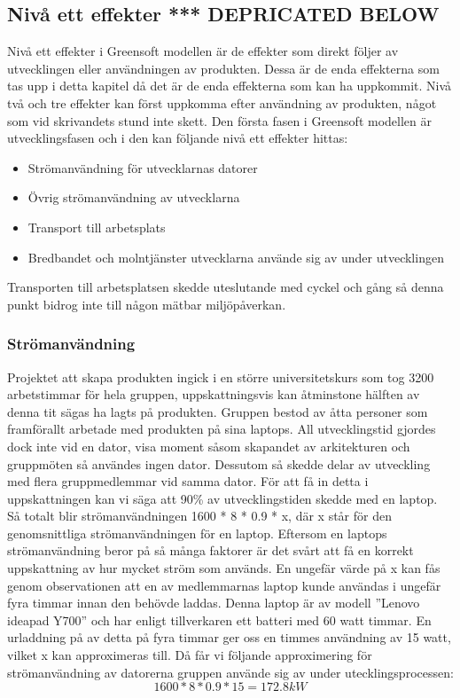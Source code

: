 \subsection{Nivå ett effekter *** DEPRICATED BELOW}
Nivå ett effekter i Greensoft modellen är de effekter som direkt följer av utvecklingen eller användningen av produkten. Dessa är de enda effekterna som tas upp i detta kapitel då det är de enda effekterna som kan ha uppkommit. Nivå två och tre effekter kan först uppkomma efter användning av produkten, något som vid skrivandets stund inte skett. Den första fasen i Greensoft modellen är utvecklingsfasen och i den kan följande nivå ett effekter hittas:
\begin{itemize}
	\item Strömanvändning för utvecklarnas datorer
	\item Övrig strömanvändning av utvecklarna
	\item Transport till arbetsplats
	\item Bredbandet och molntjänster utvecklarna använde sig av under utvecklingen
\end{itemize}

Transporten till arbetsplatsen skedde uteslutande med cyckel och gång så denna punkt bidrog inte till någon mätbar miljöpåverkan.

\subsubsection{Strömanvändning}
Projektet att skapa produkten ingick i en större universitetskurs som tog 3200 arbetstimmar för hela gruppen, uppskattningsvis kan åtminstone hälften av denna tit sägas ha lagts på produkten. Gruppen bestod av åtta personer som framförallt arbetade med produkten på sina laptops. All utvecklingstid gjordes dock inte vid en dator, visa moment såsom skapandet av arkitekturen och gruppmöten så användes ingen dator. Dessutom så skedde delar av utveckling med flera gruppmedlemmar vid samma dator. För att få in detta i uppskattningen kan vi säga att 90\% av utvecklingstiden skedde med en laptop. Så totalt blir strömanvändningen 1600 * 8 * 0.9 * x, där x står för den genomsnittliga strömanvändningen för en laptop. Eftersom en laptops strömanvändning beror på så många faktorer är det svårt att få en korrekt uppskattning av hur mycket ström som används. En ungefär värde på x kan fås genom observationen att en av medlemmarnas laptop kunde användas i ungefär fyra timmar innan den behövde laddas. Denna laptop är av modell ''Lenovo ideapad Y700'' och har enligt tillverkaren \cite{lenovo} ett batteri med 60 watt timmar. En urladdning på av detta på fyra timmar ger oss en timmes användning av 15 watt, vilket x kan approximeras till. Då får vi följande approximering för strömanvändning av datorerna gruppen använde sig av under utecklingsprocessen: $$1600 * 8 * 0.9 * 15 = 172.8kW$$

